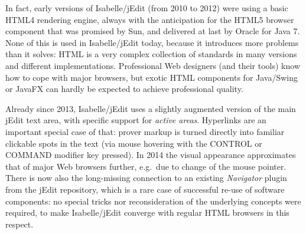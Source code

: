\begin{isabellebody}
\begin{isamarkuptext}
In fact, early versions of Isabelle/jEdit (from 2010 to 2012) were using a
basic HTML4 rendering engine, always with the anticipation for the HTML5
browser component that was promised by Sun, and delivered at last by Oracle
for Java 7. None of this is used in Isabelle/jEdit today, because it
introduces more problems than it solves: HTML is a very complex collection
of standards in many versions and different implementations. Professional
Web designers (and their tools) know how to cope with major browsers, but
exotic HTML components for Java/Swing or JavaFX can hardly be expected to
achieve professional quality.

Already since 2013, Isabelle/jEdit uses a slightly augmented version of the
main jEdit text area, with specific support for \emph{active areas}.
Hyperlinks are an important special case of that: prover markup is turned
directly into familiar clickable spots in the text (via mouse hovering with
the CONTROL or COMMAND modifier key pressed). In 2014 the visual appearance
approximates that of major Web browsers further, e.g.\ due to change of the
mouse pointer. There is now also the long-missing connection to an existing
\emph{Navigator} plugin from the jEdit repository, which is a rare case of
successful re-use of software components: no special tricks nor
reconsideration of the underlying concepts were required, to make
Isabelle/jEdit converge with regular HTML browsers in this respect.


\end{isamarkuptext}
\end{isabellebody}
